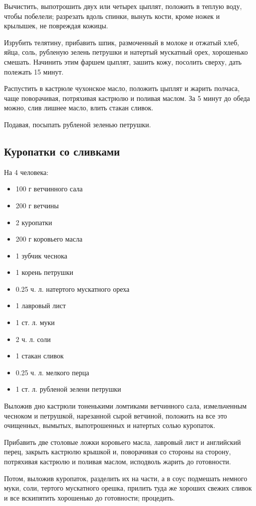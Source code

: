 Вычистить, выпотрошить двух или четырех цыплят, положить в теплую воду, чтобы побелели; разрезать вдоль спинки, вынуть кости, кроме ножек и крылышек, не повреждая кожицы.

Изрубить телятину, прибавить шпик, размоченный в молоке и отжатый хлеб, яйца, соль, рубленую зелень петрушки и натертый мускатный орех, хорошенько смешать. Начинить этим фаршем цыплят, зашить кожу, посолить сверху, дать полежать 15 минут.

Распустить в кастрюле чухонское масло, положить цыплят и жарить полчаса, чаще поворачивая, потряхивая кастрюлю и поливая маслом. За 5 минут до обеда можно, слив лишнее масло, влить стакан сливок.

Подавая, посыпать рубленой зеленью петрушки.

\subsection{Куропатки со сливками}
На 4 человека:
\begin{itemize} 	
	\item 100 г ветчинного сала 
    \item 200 г ветчины 
    \item 2 куропатки 
    \item 200 г коровьего масла 
    \item 1 зубчик чеснока 
    \item 1 корень петрушки 
    \item 0.25 ч. л. натертого мускатного ореха 
    \item 1 лавровый лист 
    \item 1 ст. л. муки 
    \item 2 ч. л. соли 
    \item 1 стакан сливок 
    \item 0.25 ч. л. мелкого перца 
    \item 1 ст. л. рубленой зелени петрушки
\end{itemize}

Выложив дно кастрюли тоненькими ломтиками ветчинного сала, измельченным чесноком и петрушкой, нарезанной сырой ветчиной, положить на все это очищенных, вымытых, выпотрошенных и натертых солью куропаток.

Прибавить две столовые ложки коровьего масла, лавровый лист и английский перец, закрыть кастрюлю крышкой и, поворачивая со стороны на сторону, потряхивая кастрюлю и поливая маслом, исподволь жарить до готовности.

Потом, выложив куропаток, разделить их на части, а в соус подмешать немного муки, соли, тертого мускатного орешка, прилить туда же хороших свежих сливок и все вскипятить хорошенько до готовности; процедить.

